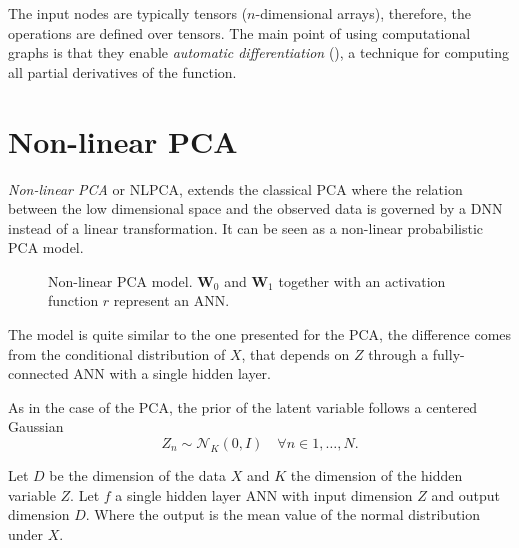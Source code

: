 The input nodes are typically tensors (\(n\)-dimensional arrays), therefore, the operations are defined over tensors. The main point of using computational graphs is that they enable \emph{automatic differentiation} (\cite{griewank1989automatic}), a technique for computing all partial derivatives of the function.


\section{Non-linear PCA}

\textit{Non-linear PCA} or NLPCA, extends the classical PCA where the relation between the low dimensional space and the observed data is governed by a DNN instead of a linear transformation.
It can be seen as a non-linear probabilistic PCA model.

\begin{figure}[h!]
  \centering
  \caption{Non-linear PCA model. \( \bm{W}_0 \) and \( \bm{W}_1 \)  together with an activation function \(r\) represent an ANN.}\label{fig:ppca}
\end{figure}


The model is quite similar to the one presented for the PCA, the difference comes from the conditional distribution of \(X\), that depends on \(Z\) through a fully-connected ANN with a single hidden layer.

As in the case of the PCA, the prior of the latent variable follows a centered Gaussian
\[
  Z_{n} \sim \mathcal{N}_{K}(0,I) \quad \forall n \in 1,\dots,N.
\]

Let \(D\) be the dimension of the data \(X\) and \(K\) the dimension of the hidden variable \(Z\). Let \(f\) a single hidden layer ANN with input dimension \(Z\) and output dimension \(D\). Where the output is the mean value of the normal distribution under \(X\).

